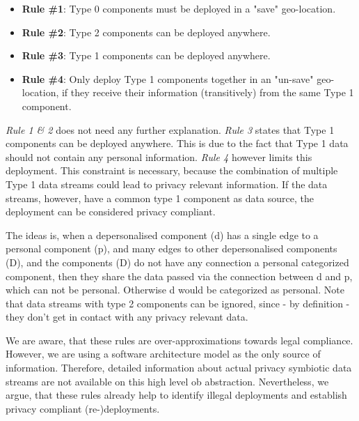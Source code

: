 \begin{itemize}
	\label{enum:deployment_rules}
	\setlength\itemsep{0em}
	\item \textbf{Rule \#1}: Type 0 components must be deployed in a "save" geo-location.
	\item \textbf{Rule \#2}: Type 2 components can be deployed anywhere.
	\item \textbf{Rule \#3}: Type 1 components can be deployed anywhere.
	\item \textbf{Rule \#4}: Only deploy Type 1 components together in an "un-save" geo-location, if they receive their information (transitively) from the same Type 1 component.
\end{itemize}

\textit{Rule 1 \& 2} does not need any further explanation. \textit{Rule 3} states that Type 1 components can be deployed anywhere. This is due to the fact that Type 1 data should not contain any personal information. \textit{Rule 4} however limits this deployment. This constraint is necessary, because the combination of multiple Type 1 data streams could lead to privacy relevant information. If the data streams, however, have a common type 1 component as data source, the deployment can be considered privacy compliant.

The ideas is, when a depersonalised component (d) has a single edge to a personal component (p), and many edges to other depersonalised components (D), and the components (D) do not have any connection a personal categorized component, then they share the data passed via the connection between d and p, which can not be personal. Otherwise d would be categorized as personal. Note that data streams with type 2 components can be ignored, since - by definition - they don't get in contact with any privacy relevant data. 

We are aware, that these rules are over-approximations towards legal compliance. However, we are using a software architecture model as the only source of information. Therefore, detailed information about actual privacy symbiotic data streams are not available on this high level ob abstraction. Nevertheless, we argue, that these rules already help to identify illegal deployments and establish privacy compliant (re-)deployments.

